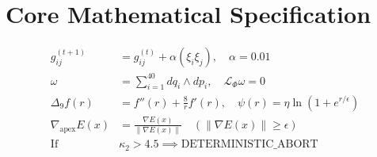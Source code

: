 \documentclass[11pt,preview,varwidth]{standalone}
\begin{document}
\section*{Core Mathematical Specification}
\begin{align}
g_{ij}^{(t+1)} &= g_{ij}^{(t)} + \alpha (\xi_i \xi_j), \quad \alpha = 0.01 \\
\omega &= \sum_{i=1}^{40} dq_i \wedge dp_i, \quad \mathcal{L}_{\Phi} \omega = 0 \\
\Delta_9 f(r) &= f''(r) + \frac{8}{r} f'(r), \quad \psi(r) = \eta \ln\left(1 + e^{r/\epsilon}\right) \\
\nabla_{\text{apex}} E(x) &= \frac{\nabla E(x)}{\|\nabla E(x)\|} \quad (\|\nabla E(x)\| \ge \epsilon) \\
\text{If } &\kappa_2 > 4.5 \implies \text{DETERMINISTIC\_ABORT}
\end{align}
\end{document}
